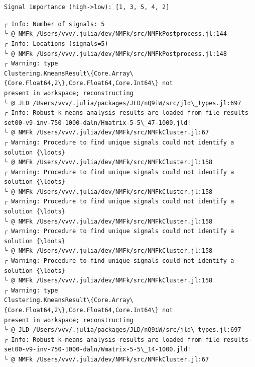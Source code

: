 \documentclass[11pt]{article}
\begin{document}
    \begin{center}
    \end{center}
    { \hspace*{\fill} \\}

    \begin{Verbatim}[commandchars=\\\{\}]

    \end{Verbatim}

    \begin{center}
    \end{center}
    { \hspace*{\fill} \\}

    \begin{Verbatim}[commandchars=\\\{\}]
Signal importance (high->low): [1, 3, 5, 4, 2]
    \end{Verbatim}

    \begin{Verbatim}[commandchars=\\\{\}]
┌ Info: Number of signals: 5
└ @ NMFk /Users/vvv/.julia/dev/NMFk/src/NMFkPostprocess.jl:144
┌ Info: Locations (signals=5)
└ @ NMFk /Users/vvv/.julia/dev/NMFk/src/NMFkPostprocess.jl:148
┌ Warning: type
Clustering.KmeansResult\{Core.Array\{Core.Float64,2\},Core.Float64,Core.Int64\} not
present in workspace; reconstructing
└ @ JLD /Users/vvv/.julia/packages/JLD/nQ9iW/src/jld\_types.jl:697
┌ Info: Robust k-means analysis results are loaded from file results-
set00-v9-inv-750-1000-daln/Hmatrix-5-5\_47-1000.jld!
└ @ NMFk /Users/vvv/.julia/dev/NMFk/src/NMFkCluster.jl:67
┌ Warning: Procedure to find unique signals could not identify a solution {\ldots}
└ @ NMFk /Users/vvv/.julia/dev/NMFk/src/NMFkCluster.jl:158
┌ Warning: Procedure to find unique signals could not identify a solution {\ldots}
└ @ NMFk /Users/vvv/.julia/dev/NMFk/src/NMFkCluster.jl:158
┌ Warning: Procedure to find unique signals could not identify a solution {\ldots}
└ @ NMFk /Users/vvv/.julia/dev/NMFk/src/NMFkCluster.jl:158
┌ Warning: Procedure to find unique signals could not identify a solution {\ldots}
└ @ NMFk /Users/vvv/.julia/dev/NMFk/src/NMFkCluster.jl:158
┌ Warning: Procedure to find unique signals could not identify a solution {\ldots}
└ @ NMFk /Users/vvv/.julia/dev/NMFk/src/NMFkCluster.jl:158
┌ Warning: type
Clustering.KmeansResult\{Core.Array\{Core.Float64,2\},Core.Float64,Core.Int64\} not
present in workspace; reconstructing
└ @ JLD /Users/vvv/.julia/packages/JLD/nQ9iW/src/jld\_types.jl:697
┌ Info: Robust k-means analysis results are loaded from file results-
set00-v9-inv-750-1000-daln/Wmatrix-5-5\_14-1000.jld!
└ @ NMFk /Users/vvv/.julia/dev/NMFk/src/NMFkCluster.jl:67
    \end{Verbatim}
\end{document}
